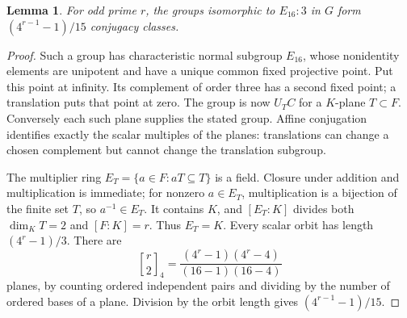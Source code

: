 \documentclass[11pt]{article}
\newtheorem{lemma}[theorem]{Lemma}
\begin{document}
\begin{lemma}\label{subgroups}
For odd prime $r$, the groups isomorphic to $E_{16}:3$ in $G$ form
$(4^{r-1}-1)/15$ conjugacy classes.
\end{lemma}
\begin{proof}
Such a group has characteristic normal subgroup $E_{16}$, whose
nonidentity elements are unipotent and have a unique common fixed
projective point. Put this point at infinity. Its complement of order
three has a second fixed point; a translation puts that point at zero.
The group is now $U_TC$ for a $K$-plane $T\subset F$. Conversely
each such plane supplies the stated group. Affine conjugation identifies
exactly the scalar multiples of the planes: translations can change a
chosen complement but cannot change the translation subgroup.

The multiplier ring $E_T=\{a\in F:aT\subseteq T\}$ is a field.
Closure under addition and multiplication is immediate; for nonzero
$a\in E_T$, multiplication is a bijection of the finite set $T$,
so $a^{-1}\in E_T$. It contains $K$, and $[E_T:K]$ divides both
$\dim_K T=2$ and $[F:K]=r$. Thus $E_T=K$. Every scalar orbit has
length $(4^r-1)/3$. There are
\[
 {r\brack 2}_4=\frac{(4^r-1)(4^r-4)}{(16-1)(16-4)}
\]
planes, by counting ordered independent pairs and dividing by the number
of ordered bases of a plane. Division by the orbit length gives
$(4^{r-1}-1)/15$.
\end{proof}
\end{document}
